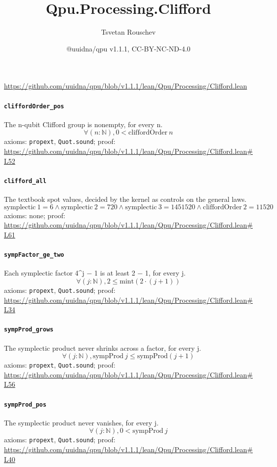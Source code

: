 \documentclass[11pt]{article}
\title{Qpu.Processing.Clifford}
\author{Tsvetan Rouschev}
\date{@uuidna/qpu v1.1.1, CC-BY-NC-ND-4.0}
\begin{document}
\maketitle
\noindent\url{https://github.com/uuidna/qpu/blob/v1.1.1/lean/Qpu/Processing/Clifford.lean}

\paragraph{\texttt{cliffordOrder\_pos}}
The n-qubit Clifford group is nonempty, for every n.
\[ \forall (n : \mathbb{N}), 0 < \mathrm{cliffordOrder}\ n \]
\noindent axioms: \texttt{propext}, \texttt{Quot.sound}; proof: \url{https://github.com/uuidna/qpu/blob/v1.1.1/lean/Qpu/Processing/Clifford.lean\#L52}

\paragraph{\texttt{clifford\_all}}
The textbook spot values, decided by the kernel as controls on the general laws.
\[ \mathrm{symplectic}\ 1 = 6 \land \mathrm{symplectic}\ 2 = 720 \land \mathrm{symplectic}\ 3 = 1451520 \land \mathrm{cliffordOrder}\ 2 = 11520 \]
\noindent axioms: none; proof: \url{https://github.com/uuidna/qpu/blob/v1.1.1/lean/Qpu/Processing/Clifford.lean\#L61}

\paragraph{\texttt{sympFactor\_ge\_two}}
Each symplectic factor 4\^{}j − 1 is at least 2 − 1, for every j.
\[ \forall (j : \mathbb{N}), 2 \le \mathrm{mint} (2 \cdot (j + 1)) \]
\noindent axioms: \texttt{propext}, \texttt{Quot.sound}; proof: \url{https://github.com/uuidna/qpu/blob/v1.1.1/lean/Qpu/Processing/Clifford.lean\#L34}

\paragraph{\texttt{sympProd\_grows}}
The symplectic product never shrinks across a factor, for every j.
\[ \forall (j : \mathbb{N}), \mathrm{sympProd}\ j \le \mathrm{sympProd} (j + 1) \]
\noindent axioms: \texttt{propext}, \texttt{Quot.sound}; proof: \url{https://github.com/uuidna/qpu/blob/v1.1.1/lean/Qpu/Processing/Clifford.lean\#L56}

\paragraph{\texttt{sympProd\_pos}}
The symplectic product never vanishes, for every j.
\[ \forall (j : \mathbb{N}), 0 < \mathrm{sympProd}\ j \]
\noindent axioms: \texttt{propext}, \texttt{Quot.sound}; proof: \url{https://github.com/uuidna/qpu/blob/v1.1.1/lean/Qpu/Processing/Clifford.lean\#L40}
\end{document}
